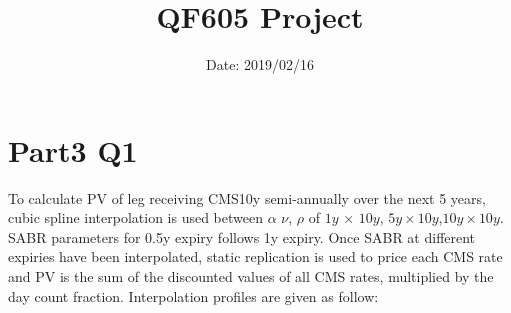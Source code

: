 \documentclass{article}
\title{\textbf{QF605 Project}}
\date{Date: 2019/02/16}
\begin{document}
	\maketitle

\section{Part3 Q1}

\noindent To calculate PV of leg receiving CMS10y semi-annually over the next 5 years, cubic spline interpolation is used between $\alpha$ $\nu$, $\rho$ of $1y$ $\times$ $10y$, $5y\times10y$,$10y\times10y$. SABR parameters for 0.5y expiry follows 1y expiry. Once SABR at different expiries have been interpolated, static replication is used to price each CMS rate and PV is the sum of the discounted values of all CMS rates, multiplied by the day count fraction. Interpolation profiles are given as follow:\\
\end{document}
